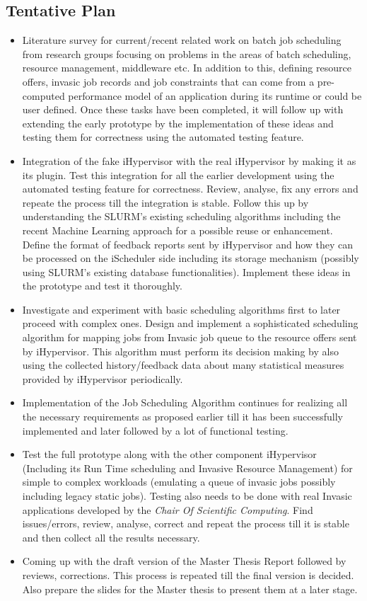 \subsection{Tentative Plan}
\begin{itemize}
\item Literature survey for current/recent related work on batch job scheduling from research groups focusing on problems in the areas of batch scheduling, resource management, middleware etc. In addition to this, defining resource offers, invasic job records and job constraints that can come from a pre-computed performance model of an application during its runtime or could be user defined. Once these tasks have been completed, it will follow up with extending the early prototype by the implementation of these ideas and testing them for correctness using the automated testing feature.
\item Integration of the fake iHypervisor with the real iHypervisor by making it as its plugin. Test this integration for all the earlier development using the automated testing feature for correctness. Review, analyse, fix any errors and repeate the process till the integration is stable. Follow this up by understanding the SLURM's existing scheduling algorithms including the recent Machine Learning approach for a possible reuse or enhancement. Define the format of feedback reports sent by iHypervisor and how they can be processed on the iScheduler side including its storage mechanism (possibly using SLURM's existing database functionalities). Implement these ideas in the prototype and test it thoroughly.
\item Investigate and experiment with basic scheduling algorithms first to later proceed with complex ones. Design and implement a sophisticated scheduling algorithm for mapping jobs from Invasic job queue to the resource offers sent by iHypervisor. This algorithm must perform its decision making by also using the collected history/feedback data about many statistical measures provided by iHypervisor periodically.
\item Implementation of the Job Scheduling Algorithm continues for realizing all the necessary requirements as proposed earlier till it has been successfully implemented and later followed by a lot of functional testing.
\item Test the full prototype along with the other component iHypervisor (Including its Run Time scheduling and Invasive Resource Management) for simple to complex workloads (emulating a queue of invasic jobs possibly including legacy static jobs). Testing also needs to be done with real Invasic applications developed by the \textit{Chair Of Scientific Computing}. Find issues/errors, review, analyse, correct and repeat the process till it is stable and then collect all the results necessary.
\item Coming up with the draft version of the Master Thesis Report followed by reviews, corrections. This process is repeated till the final version is decided. Also prepare the slides for the Master thesis to present them at a later stage.
\end{itemize}
